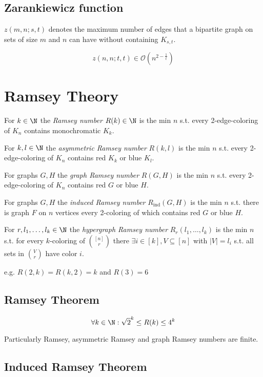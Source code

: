 \subsection*{Zarankiewicz function}

$z(m,n;s,t)$ denotes the maximum number of edges that a bipartite graph on sets of size $m$ and $n$ can have without containing $K_{s,t}$.

$$z(n,n;t,t) \in \mathcal{O}(n^{2-\frac{1}{t}})$$

\section*{Ramsey Theory}

For $k \in \N$ the \emph{Ramsey number} $R(k) \in \N$ is the min $n$ s.t. every 2-edge-coloring of $K_n$ contains monochromatic $K_k$.

\spacing

For $k, l \in \N$ the \emph{asymmetric Ramsey number} $R(k,l)$ is the min $n$ s.t. every 2-edge-coloring of $K_n$ contains red $K_k$ or blue $K_l$.

\spacing

For graphs $G, H$ the \emph{graph Ramsey number} $R(G,H)$ is the min $n$ s.t. every 2-edge-coloring of $K_n$ contains red $G$ or blue $H$.

\spacing

For graphs $G, H$ the \emph{induced Ramsey number} $R_\text{ind}(G,H)$ is the min $n$ s.t. there is graph $F$ on $n$ vertices every 2-coloring of which contains red $G$ or blue $H$.

\spacing

For $r, l_1, \dots, l_k \in \N$ the \emph{hypergraph Ramsey number} $R_r(l_1,\dots,l_k)$ is the min $n$ s.t. for every $k$-coloring of ${[n] \choose r}$ there $\exists i \in [k], V \subseteq [n]$ with $|V|=l_i$ s.t. all sets in $V \choose r$ have color $i$.

\spacing

e.g. $R(2,k) = R(k,2) = k$ and $R(3) = 6$

\subsection*{Ramsey Theorem}

$$\forall k \in \N : \sqrt{2}^k \leq R(k) \leq 4^k$$

Particularly Ramsey, asymmetric Ramsey and graph Ramsey numbers are finite.

\subsection*{Induced Ramsey Theorem}

